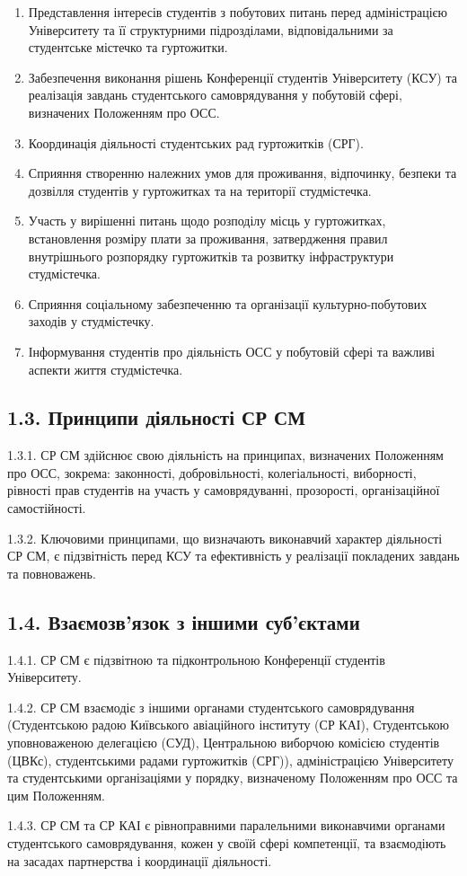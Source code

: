         \begin{enumerate}[label=\alph*)]
            \item Представлення інтересів студентів з побутових питань перед адміністрацією Університету та її структурними підрозділами, відповідальними за студентське містечко та гуртожитки.
            \item Забезпечення виконання рішень Конференції студентів Університету (КСУ) та реалізація завдань студентського самоврядування у побутовій сфері, визначених Положенням про ОСС.
            \item Координація діяльності студентських рад гуртожитків (СРГ).
            \item Сприяння створенню належних умов для проживання, відпочинку, безпеки та дозвілля студентів у гуртожитках та на території студмістечка.
            \item Участь у вирішенні питань щодо розподілу місць у гуртожитках, встановлення розміру плати за проживання, затвердження правил внутрішнього розпорядку гуртожитків та розвитку інфраструктури студмістечка.
            \item Сприяння соціальному забезпеченню та організації культурно-побутових заходів у студмістечку.
            \item Інформування студентів про діяльність ОСС у побутовій сфері та важливі аспекти життя студмістечка.
        \end{enumerate}

\subsection*{1.3. Принципи діяльності СР СМ}
    1.3.1. СР СМ здійснює свою діяльність на принципах, визначених Положенням про ОСС, зокрема: законності, добровільності, колегіальності, виборності, рівності прав студентів на участь у самоврядуванні, прозорості, організаційної самостійності.

    1.3.2. Ключовими принципами, що визначають виконавчий характер діяльності СР СМ, є підзвітність перед КСУ та ефективність у реалізації покладених завдань та повноважень.

\subsection*{1.4. Взаємозв'язок з іншими суб'єктами}
    1.4.1. СР СМ є підзвітною та підконтрольною Конференції студентів Університету.

    1.4.2. СР СМ взаємодіє з іншими органами студентського самоврядування (Студентською радою Київського авіаційного інституту (СР КАІ), Студентською уповноваженою делегацією (СУД), Центральною виборчою комісією студентів (ЦВКс), студентськими радами гуртожитків (СРГ)), адміністрацією Університету та студентськими організаціями у порядку, визначеному Положенням про ОСС та цим Положенням.

    1.4.3. СР СМ та СР КАІ є рівноправними паралельними виконавчими органами студентського самоврядування, кожен у своїй сфері компетенції, та взаємодіють на засадах партнерства і координації діяльності.
